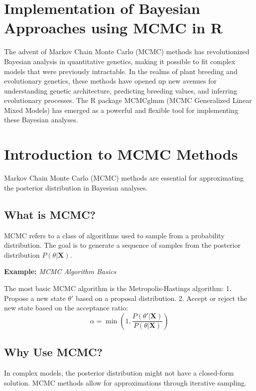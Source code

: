 \documentclass[12pt,a4paper]{article}
\newenvironment{example}[1][]
{\begin{basebox}[linecolor=uqgold]
\textbf{\color{uqgold}Example:} \textit{#1}\par\noindent\ignorespaces}
{\end{basebox}}
\begin{document}
\section{Implementation of Bayesian Approaches using MCMC in R}

The advent of Markov Chain Monte Carlo (MCMC) methods has revolutionized Bayesian analysis in quantitative genetics, making it possible to fit complex models that were previously intractable. In the realms of plant breeding and evolutionary genetics, these methods have opened up new avenues for understanding genetic architecture, predicting breeding values, and inferring evolutionary processes. The R package MCMCglmm (MCMC Generalized Linear Mixed Models) has emerged as a powerful and flexible tool for implementing these Bayesian analyses.

\section{Introduction to MCMC Methods}

Markov Chain Monte Carlo (MCMC) methods are essential for approximating the posterior distribution in Bayesian analyses.

\subsection{What is MCMC?}

MCMC refers to a class of algorithms used to sample from a probability distribution. The goal is to generate a sequence of samples from the posterior distribution \( P(\theta | \mathbf{X}) \).

\begin{example}[MCMC Algorithm Basics]
The most basic MCMC algorithm is the Metropolis-Hastings algorithm:
1. Propose a new state \( \theta' \) based on a proposal distribution.
2. Accept or reject the new state based on the acceptance ratio:
\[
\alpha = \min \left( 1, \frac{P(\theta' | \mathbf{X})}{P(\theta | \mathbf{X})} \right)
\]
\end{example}

\subsection{Why Use MCMC?}

In complex models, the posterior distribution might not have a closed-form solution. MCMC methods allow for approximations through iterative sampling.
\end{document}
